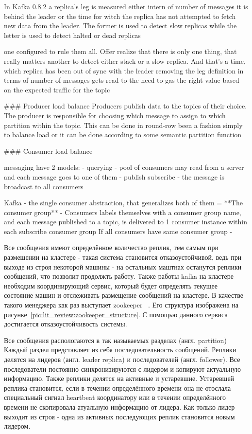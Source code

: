 In Kafka 0.8.2 a replica's leg is measured either intern of number of messages it is behind the leader or the time for witch the replica has not attempted to fetch new data from the leader.
The former is used to detect slow replicas while the letter is used to detect halted or dead replicas

one configured to rule them all.
Offer realize that there is only one thing, that really matters another to detect either stack or a slow replica. And that's a time, which replica has been out of sync with the leader
removing the leg definition in terms of number of messages gets read to the need to gas the right value based on the expected traffic for the topic

### Producer load balance
Producers publish data to the topics of their choice. The producer is responsible for choosing which message to assign to which partition within the topic.
This can be done in round-row been a fashion simply to balance load or it can be done according to some semantic partition function

### Consumer load balance

messaging have 2 models:
- querying - pool of consumers may read from a server and each message goes to one of them
- publish subscribe - the message is broadcast to all consumers

Kafka - the single consumer abstraction, that generalizes both of them = **The consumer group** - Consumers labels themselves with a consumer group name, and each message published to a topic, is delivered to 1 consumer instance within each subscribe consumer group
If all consumers have same consumer group -



Все сообщения имеют определённое количество реплик, тем самым при размещении на кластере - такая система становится отказоустойчивой, ведь при выходе из строя некоторой машины - на остальных маштнах останутся реплики сообщений, что позволит продолжть работу.
Также работы kafka на кластере необходим координирующий сервис, который будет определять текущее состояние машин и отслеживать размещение сообщений на кластере.
В качестве такого менеджера как раз выступает zookeeper ~\cite{zookeeper_documentation_intro}.
Его структура изображена на рисунке~\ref{pic:lit_review:zookeeper_structure}.                   
С помощью данного сервиса достигается отказоустойчивость системы.

Все сообщения распологаются в так называемых разделах (англ. partition)
Каждый раздел представляет из себя последовательность сообщений.
Реплики делятся на лидеров (англ. leader replica) и последователей (англ. follower).
Все последователи постоянно синхронизируются с лидером и копируют актуальную информацию.
Также реплики делятся на активные и устаревшие.
Устаревшей реплика становится, если в течении определённого времени она не отослала специальный сигнал heartbeat координатору или в течении определённого времени не скопировала атуальную информацию от лидера.
Как только лидер выходит из строя - одна из активных последующих реплик становится новым лидером.

